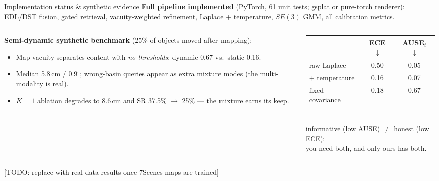 \documentclass[aspectratio=169,10pt]{beamer}
\newcommand{\TODO}[1]{{\color{red}[TODO: #1]}}
\newcommand{\srcnote}[1]{{\tiny\color{ink!55}#1}}
\newcommand{\good}[1]{{\color{uLow}#1}}
\newcommand{\bad}[1]{{\color{uHigh}#1}}
\begin{document}
\begin{frame}{Implementation status \& synthetic evidence}
  \textbf{Full pipeline implemented} (PyTorch, 61 unit tests; gsplat or
  pure-torch renderer): EDL/DST fusion, gated retrieval, vacuity-weighted
  refinement, Laplace + temperature, $SE(3)$ GMM, all calibration metrics.
  \vspace{1mm}
  \begin{columns}[T]
    \begin{column}{0.55\textwidth}
      \textbf{Semi-dynamic synthetic benchmark} (25\% of objects moved
      after mapping):
      \begin{itemize}\small
        \item Map vacuity separates content with \emph{no thresholds}:
              dynamic \bad{0.67} vs.\ static \good{0.16}.
        \item Median 5.8\,cm / 0.9$^\circ$; wrong-basin queries appear as
              extra mixture modes (the multi-modality is real).
        \item $K{=}1$ ablation degrades to 8.6\,cm and SR
              37.5\% $\to$ 25\% --- the mixture earns its keep.
      \end{itemize}
    \end{column}
    \begin{column}{0.43\textwidth}
      \centering
      \small
      \begin{tabular}{lcc}
        \toprule
        & ECE $\downarrow$ & AUSE$_t$ $\downarrow$\\
        \midrule
        raw Laplace      & \bad{0.50} & 0.05\\
        + temperature    & \good{0.16} & 0.07\\
        fixed covariance & 0.18 & \bad{0.67}\\
        \bottomrule
      \end{tabular}
      \\[2mm]
      \srcnote{informative (low AUSE) $\ne$ honest (low ECE):\\
      you need both, and only ours has both.}
    \end{column}
  \end{columns}
  \vspace{1mm}
  \TODO{replace with real-data results once 7Scenes maps are trained}
\end{frame}

\end{document}
